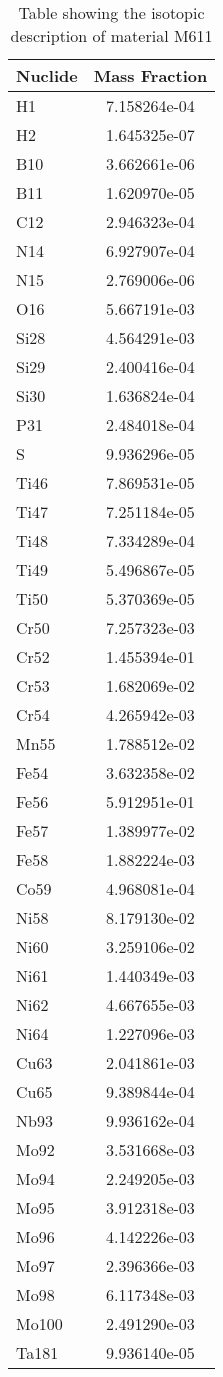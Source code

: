 \begin{centering}
\begin{table}[ht!]
\begin{tabular}{l | c}
\hline
Nuclide & Mass Fraction\\
\hline
H1 & 7.158264e-04\\
H2 & 1.645325e-07\\
B10 & 3.662661e-06\\
B11 & 1.620970e-05\\
C12 & 2.946323e-04\\
N14 & 6.927907e-04\\
N15 & 2.769006e-06\\
O16 & 5.667191e-03\\
Si28 & 4.564291e-03\\
Si29 & 2.400416e-04\\
Si30 & 1.636824e-04\\
P31 & 2.484018e-04\\
S & 9.936296e-05\\
Ti46 & 7.869531e-05\\
Ti47 & 7.251184e-05\\
Ti48 & 7.334289e-04\\
Ti49 & 5.496867e-05\\
Ti50 & 5.370369e-05\\
Cr50 & 7.257323e-03\\
Cr52 & 1.455394e-01\\
Cr53 & 1.682069e-02\\
Cr54 & 4.265942e-03\\
Mn55 & 1.788512e-02\\
Fe54 & 3.632358e-02\\
Fe56 & 5.912951e-01\\
Fe57 & 1.389977e-02\\
Fe58 & 1.882224e-03\\
Co59 & 4.968081e-04\\
Ni58 & 8.179130e-02\\
Ni60 & 3.259106e-02\\
Ni61 & 1.440349e-03\\
Ni62 & 4.667655e-03\\
Ni64 & 1.227096e-03\\
Cu63 & 2.041861e-03\\
Cu65 & 9.389844e-04\\
Nb93 & 9.936162e-04\\
Mo92 & 3.531668e-03\\
Mo94 & 2.249205e-03\\
Mo95 & 3.912318e-03\\
Mo96 & 4.142226e-03\\
Mo97 & 2.396366e-03\\
Mo98 & 6.117348e-03\\
Mo100 & 2.491290e-03\\
Ta181 & 9.936140e-05
\end{tabular}
\caption{Table showing the isotopic description of material M611}
\label{table:material_M611}
\end{table}\clearpage


\end{centering}
